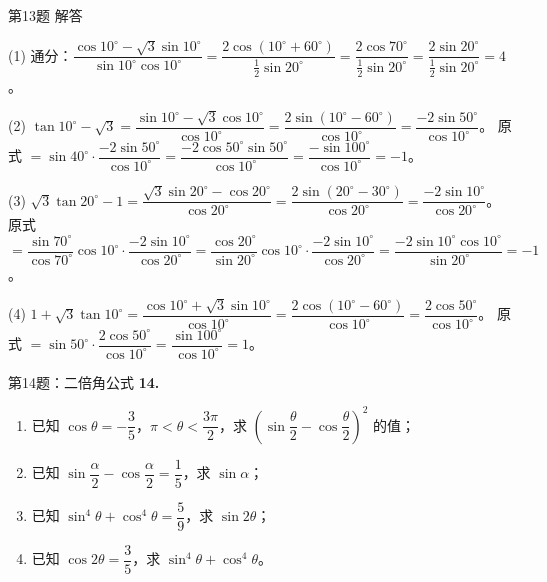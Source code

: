 \documentclass[10pt,aspectratio=169,serif]{beamer}
\begin{document}
\begin{frame}[t]{第13题 解答}
\begin{tcolorbox}[colback=orange!10,colframe=orange,title=\textbf{解}]
(1) 通分：$\dfrac{\cos10^\circ-\sqrt3\sin10^\circ}{\sin10^\circ\cos10^\circ}=\dfrac{2\cos(10^\circ+60^\circ)}{\frac12\sin20^\circ}=\dfrac{2\cos70^\circ}{\frac12\sin20^\circ}=\dfrac{2\sin20^\circ}{\frac12\sin20^\circ}=4$。

(2) $\tan10^\circ-\sqrt3=\dfrac{\sin10^\circ-\sqrt3\cos10^\circ}{\cos10^\circ}=\dfrac{2\sin(10^\circ-60^\circ)}{\cos10^\circ}=\dfrac{-2\sin50^\circ}{\cos10^\circ}$。
原式 $=\sin40^\circ\cdot\dfrac{-2\sin50^\circ}{\cos10^\circ}=\dfrac{-2\cos50^\circ\sin50^\circ}{\cos10^\circ}=\dfrac{-\sin100^\circ}{\cos10^\circ}=-1$。

(3) $\sqrt3\tan20^\circ-1=\dfrac{\sqrt3\sin20^\circ-\cos20^\circ}{\cos20^\circ}=\dfrac{2\sin(20^\circ-30^\circ)}{\cos20^\circ}=\dfrac{-2\sin10^\circ}{\cos20^\circ}$。
原式 $=\dfrac{\sin70^\circ}{\cos70^\circ}\cos10^\circ\cdot\dfrac{-2\sin10^\circ}{\cos20^\circ}=\dfrac{\cos20^\circ}{\sin20^\circ}\cos10^\circ\cdot\dfrac{-2\sin10^\circ}{\cos20^\circ}=\dfrac{-2\sin10^\circ\cos10^\circ}{\sin20^\circ}=-1$。

(4) $1+\sqrt3\tan10^\circ=\dfrac{\cos10^\circ+\sqrt3\sin10^\circ}{\cos10^\circ}=\dfrac{2\cos(10^\circ-60^\circ)}{\cos10^\circ}=\dfrac{2\cos50^\circ}{\cos10^\circ}$。
原式 $=\sin50^\circ\cdot\dfrac{2\cos50^\circ}{\cos10^\circ}=\dfrac{\sin100^\circ}{\cos10^\circ}=1$。
\end{tcolorbox}
\end{frame}

\begin{frame}[t]{第14题：二倍角公式}
\textbf{14.}
\begin{enumerate}
  \item 已知 $\cos\theta=-\dfrac35$，$\pi<\theta<\dfrac{3\pi}{2}$，求 $\left(\sin\dfrac{\theta}{2}-\cos\dfrac{\theta}{2}\right)^2$ 的值；
  \item 已知 $\sin\dfrac{\alpha}{2}-\cos\dfrac{\alpha}{2}=\dfrac15$，求 $\sin\alpha$；
  \item 已知 $\sin^4\theta+\cos^4\theta=\dfrac59$，求 $\sin 2\theta$；
  \item 已知 $\cos 2\theta=\dfrac35$，求 $\sin^4\theta+\cos^4\theta$。
\end{enumerate}
\end{frame}
\end{document}
